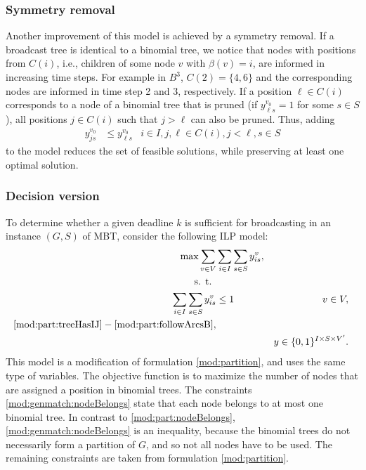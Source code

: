 \subsubsection{Symmetry removal}
Another improvement of this model is achieved by a symmetry removal.
If a broadcast tree is identical to a binomial tree, we notice that nodes with positions from $C(i)$, i.e., children of some node $v$ with $\beta(v)=i$, are informed in increasing time steps.
For example in $B^3$, $C(2)=\{4,6\}$ and the corresponding nodes are informed in time step 2 and 3, respectively.
If a position $\ell\in C(i)$ corresponds to a node of a binomial tree that is pruned (if $y^{v_0}_{\ell s}=1$ for some $s\in S$),
all positions $j\in C(i)$ such that $j>\ell$ can also be pruned.
Thus, adding
\begin{align}
\label{mod:part:sr}
y^{v_0}_{js}&\leq y^{v_0}_{\ell s}&i\in I,j,\ell\in C(i),j<\ell, s\in S
\end{align}
to the model reduces the set of feasible solutions, while preserving at least one optimal solution.

\subsubsection{Decision version}\label{sec:mbt:ilp:dec}

To determine whether a given deadline $k$ is sufficient for broadcasting in an instance $(G,S)$ of MBT, consider the following ILP model:
\begin{subequations}\label{mod:genmatch}
\begin{align}
\notag \max\sum\limits_{v\in V}&\sum\limits_{i\in I}\sum\limits_{s\in S}   y_{is}^v,\\
\notag \text{s. t. } \\
\label{mod:genmatch:nodeBelongs} \sum\limits_{i\in I}\sum\limits_{s\in S}y^v_{is} & \leq 1 & v\in V,\\
\notag\eqref{mod:part:treeHasIJ} - \eqref{mod:part:followArcsB},\\
\label{mod:genmatch:dim}&&y \in \{0,1\}^{I\times S\times V'}.
\end{align}~
\end{subequations}
This model is a modification of formulation \eqref{mod:partition}, and uses the same type of variables.
The objective function is to maximize the number of nodes that are assigned a position in binomial trees.
The constraints \eqref{mod:genmatch:nodeBelongs} state that each node belongs to at most one binomial tree.
In contrast to \eqref{mod:part:nodeBelongs}, \eqref{mod:genmatch:nodeBelongs} is an inequality, 
because the binomial trees do not necessarily form a partition of $G$, and so not all nodes have to be used.
The remaining constraints are taken from formulation \eqref{mod:partition}.

